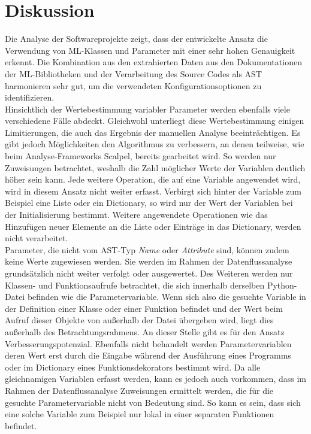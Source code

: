 \documentclass[german,bachelor]{swsLeipzig}
\begin{document}
\section{Diskussion}
Die Analyse der Softwareprojekte zeigt, dass der entwickelte Ansatz die Verwendung von ML-Klassen und Parameter
mit einer sehr hohen Genauigkeit erkennt.
Die Kombination aus den extrahierten Daten aus den Dokumentationen der ML-Bibliotheken und der Verarbeitung des Source Codes als AST
harmonieren sehr gut, um die verwendeten Konfigurationsoptionen zu identifizieren.\\
\indent Hinsichtlich der Wertebestimmung variabler Parameter werden ebenfalls viele verschiedene Fälle abdeckt.
Gleichwohl unterliegt diese Wertebestimmung einigen Limitierungen, die auch das Ergebnis der manuellen Analyse beeinträchtigen.
Es gibt jedoch Möglichkeiten den Algorithmus zu verbessern, an denen teilweise, wie beim
Analyse-Frameworks Scalpel, bereits gearbeitet wird.
So werden nur Zuweisungen betrachtet, weshalb die Zahl möglicher Werte der Variablen deutlich höher sein kann.
Jede weitere Operation, die auf eine Variable angewendet wird, wird in diesem Ansatz nicht weiter erfasst.
Verbirgt sich hinter der Variable zum Beispiel eine Liste oder ein Dictionary, so wird nur der Wert der Variablen bei der
Initialisierung bestimmt.
Weitere angewendete Operationen wie das Hinzufügen neuer Elemente an die Liste oder Einträge in das Dictionary,
werden nicht verarbeitet.\\
\indent Parameter, die nicht vom AST-Typ \textit{Name} oder \textit{Attribute} sind, können zudem keine Werte zugewiesen werden.
Sie werden im Rahmen der Datenflussanalyse grundsätzlich nicht weiter verfolgt oder ausgewertet.
Des Weiteren werden nur Klassen- und Funktionsaufrufe betrachtet, die sich innerhalb derselben Python-Datei befinden wie die Parametervariable.
Wenn sich also die gesuchte Variable in der Definition einer Klasse oder einer Funktion befindet und der Wert beim Aufruf
dieser Objekte von außerhalb der Datei übergeben wird, liegt dies außerhalb des Betrachtungsrahmens.
An dieser Stelle gibt es für den Ansatz Verbesserungspotenzial.
Ebenfalls nicht behandelt werden Parametervariablen deren Wert erst durch die Eingabe während der Ausführung eines Programms
oder im Dictionary eines Funktionsdekorators bestimmt wird.
Da alle gleichnamigen Variablen erfasst werden, kann es jedoch auch vorkommen, dass im Rahmen der Datenflussanalyse
Zuweisungen ermittelt werden, die für die gesuchte Parametervariable nicht von Bedeutung sind.
So kann es sein, dass sich eine solche Variable zum Beispiel nur lokal in einer separaten Funktionen befindet.\\
\end{document}
